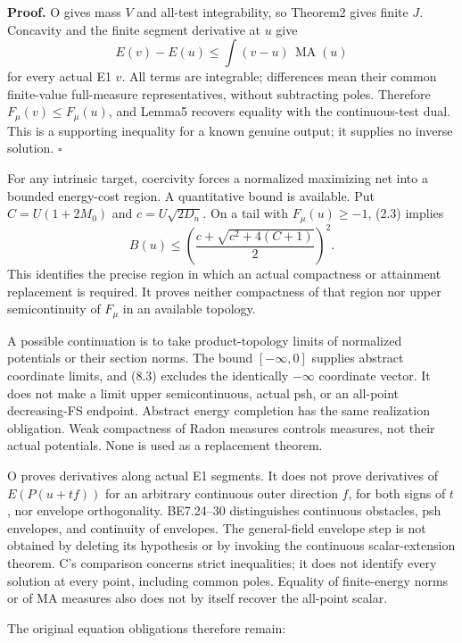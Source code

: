 \documentclass[
  11pt,
]{article}
\begin{document}
\textbf{Proof.} O gives mass \(V\) and all-test integrability, so
Theorem2 gives finite \(J\). Concavity and the finite segment derivative
at \(u\) give \[
 E(v)-E(u)\leq\int(v-u)\,\operatorname{MA}(u)
\] for every actual E1 \(v\). All terms are integrable; differences mean
their common finite-value full-measure representatives, without
subtracting poles. Therefore \(F_\mu(v)\leq F_\mu(u)\), and Lemma5
recovers equality with the continuous-test dual. This is a supporting
inequality for a known genuine output; it supplies no inverse solution.
\(\square\)

For any intrinsic target, coercivity forces a normalized maximizing net
into a bounded energy-cost region. A quantitative bound is available.
Put \(C=U(1+2M_0)\) and \(c=U\sqrt{2D_n}\). On a tail with
\(F_\mu(u)\geq-1\), (2.3) implies \[
 B(u)\leq
 \left(\frac{c+\sqrt{c^2+4(C+1)}}2\right)^2. \tag{10.1}
\] This identifies the precise region in which an actual compactness or
attainment replacement is required. It proves neither compactness of
that region nor upper semicontinuity of \(F_\mu\) in an available
topology.

A possible continuation is to take product-topology limits of normalized
potentials or their section norms. The bound \([-\infty,0]\) supplies
abstract coordinate limits, and (8.3) excludes the identically
\(-\infty\) coordinate vector. It does not make a limit upper
semicontinuous, actual psh, or an all-point decreasing-FS endpoint.
Abstract energy completion has the same realization obligation. Weak
compactness of Radon measures controls measures, not their actual
potentials. None is used as a replacement theorem.

O proves derivatives along actual E1 segments. It does not prove
derivatives of \(E(P(u+tf))\) for an arbitrary continuous outer
direction \(f\), for both signs of \(t\), nor envelope orthogonality.
BE7.24--30 distinguishes continuous obstacles, psh envelopes, and
continuity of envelopes. The general-field envelope step is not obtained
by deleting its hypothesis or by invoking the continuous
scalar-extension theorem. C's comparison concerns strict inequalities;
it does not identify every solution at every point, including common
poles. Equality of finite-energy norms or of MA measures also does not
by itself recover the all-point scalar.

The original equation obligations therefore remain:
\end{document}

